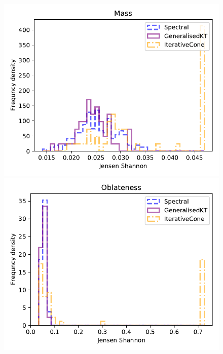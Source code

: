 \begin{figure}[htp]
    \begin{minipage}[c]{0.5\textwidth}
        \includegraphics[width=1.\textwidth]{graphics/js_scores/Mass}
    \end{minipage}\hfill
    \begin{minipage}[c]{0.5\textwidth}
        \includegraphics[width=1.\textwidth]{graphics/js_scores/oblateness}
    \end{minipage}
    \begin{minipage}[c]{0.5\textwidth}

\end{minipage}
\end{figure}
